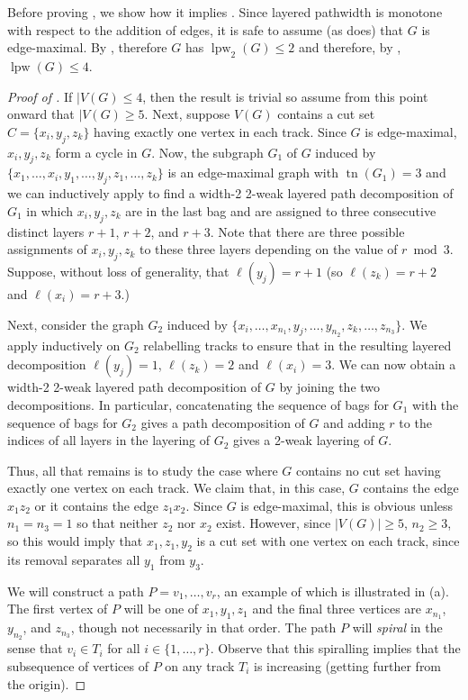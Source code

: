 \documentclass{patmorin}
\DeclareMathOperator{\tr}{tn}
\DeclareMathOperator{\lpw}{lpw}
\begin{document}
Before proving , we show how it implies .
Since layered pathwidth is monotone with respect to the addition of edges,
it is safe to assume (as  does) that $G$ is edge-maximal.
By , therefore $G$ has $\lpw_2(G)\le2$ and therefore, by
, $\lpw(G)\le 4$.

\begin{proof}[Proof of ]
  If $|V(G)\le 4$, then the result is trivial so assume from this point onward that $|V(G)\ge 5$.  Next, suppose $V(G)$ contains
  a cut set $C=\{x_i,y_j,z_k\}$ having exactly one vertex in each track.
  Since $G$ is edge-maximal, $x_i,y_j,z_k$ form a cycle in $G$.  Now,
  the subgraph $G_1$ of $G$ induced by $\{x_1,\ldots,x_i, y_1,\ldots,y_j,
  z_1,\ldots,z_k\}$ is an edge-maximal graph with $\tr(G_1)=3$ and we
  can inductively apply  to find a width-2 2-weak layered
  path decomposition of $G_1$ in which $x_i,y_j,z_k$ are in the last bag
  and are assigned to three consecutive distinct layers $r+1$, $r+2$, and $r+3$.
  Note that there are three possible assignments of $x_i,y_j,z_k$ to
  these three layers depending on the value of $r\bmod 3$.  Suppose,
  without loss of generality, that $\ell(y_j)=r+1$ (so $\ell(z_k)=r+2$
  and $\ell(x_i)=r+3$.)

  Next, consider the graph $G_2$ induced by
  $\{x_i,\ldots,x_{n_1},y_j,\ldots,y_{n_2},z_k,\ldots,z_{n_3}\}$.
  We apply  inductively on $G_2$ relabelling tracks to
  ensure that in the resulting layered decomposition $\ell(y_j)=1$,
  $\ell(z_k)=2$ and $\ell(x_i)=3$.   We can now obtain a width-2 2-weak
  layered path decomposition of $G$ by joining the two decompositions.
  In particular, concatenating the sequence of bags for $G_1$ with
  the sequence of bags for $G_2$ gives a path decomposition of $G$
  and adding $r$ to the indices of all layers in the layering of $G_2$
  gives a 2-weak layering of $G$.

  Thus, all that remains is to study the case where $G$ contains no cut
  set having exactly one vertex on each track.  We claim that, in this
  case, $G$ contains the edge $x_1z_2$ or it contains the edge $z_1x_2$.
  Since $G$ is edge-maximal, this is obvious unless $n_1=n_3=1$ so
  that neither $z_2$ nor $x_2$ exist.  However, since $|V(G)|\ge 5$, $n_2\ge 3$, so  this would imply that $x_1,z_1,y_2$ is a cut set with one vertex on
  each track, since its removal separates all $y_1$ from $y_3$.

  We will construct a path $P=v_1,\ldots,v_r$, an example of which is illustrated in (a). The first vertex of $P$ will be one of
  $x_1,y_1,z_1$ and the final three vertices are $x_{n_1}$,
  $y_{n_2}$, and $z_{n_3}$, though not necessarily in that order.
  The path $P$ will \emph{spiral} in the sense that $v_i\in T_i$
  for all $i\in\{1,\ldots,r\}$.  Observe that this spiralling implies that the subsequence of vertices of $P$ on any track $T_i$ is increasing (getting further from the origin).


\end{proof}
\end{document}
